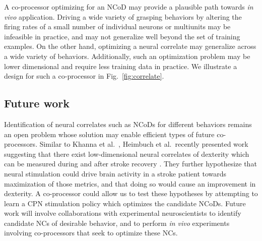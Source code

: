 \documentclass[12pt]{iopart}
\begin{document}
A co-processor optimizing for an NCoD may provide a plausible path towards \textit{in vivo}
application. Driving a wide variety of grasping behaviors by altering the firing rates of a small number of
individual neurons or multiunits may be infeasible in practice, and may not generalize well beyond
the set of training examples. On the other hand, optimizing a neural correlate may generalize across a wide
variety of behaviors. Additionally, such an optimization problem may be lower dimensional and require less
training data in practice. We illustrate a design for such a co-processor in Fig.~\ref{fig:correlate}.


\subsection{Future work}
Identification of neural correlates such as NCoDs for different behaviors remains an open problem whose
solution may enable efficient types of future co-processors. Similar to Khanna et al.\ \cite{khanna.openloop},
Heimbuch et al.\ recently presented work suggesting that there exist low-dimensional neural correlates of
dexterity which can be measured during and after stroke recovery \cite{heimbuch.sfn}. They further hypothesize
that neural stimulation could drive brain activity in a stroke patient towards maximization of those metrics,
and that doing so would cause an improvement in dexterity. A co-processor could allow us to test
these hypotheses by attempting to learn a CPN stimulation policy which optimizes the candidate
NCoDs. Future work will involve collaborations with experimental neuroscientists to identify candidate NCs of
desirable behavior, and to perform {\em in vivo} experiments involving co-processors that seek to optimize
these NCs.
\end{document}
